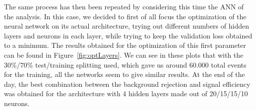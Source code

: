 \documentclass[a4paper, 10pt, openright]{report}
\begin{document}
\begin{appendices}
The same process has then been repeated by considering this time the \ac{ANN} of the analysis. In this case, we decided to first of all focus the optimization of the neural network on its actual architecture, trying out different numbers of hidden layers and  neurons in each layer, while trying to keep the validation loss obtained to a minimum. The results obtained for the optimization of this first parameter can be found in Figure~\ref{fig:optLayers}. We can see in these plots that with the 30\%/70\% test/training splitting used, which gave us around 60.000 total events for the training, all the networks seem to give similar results. At the end of the day, the best combination between the background rejection and signal efficiency was obtained for the architecture with 4 hidden layers made out of 20/15/15/10 neurons.



\end{appendices}
\end{document}
